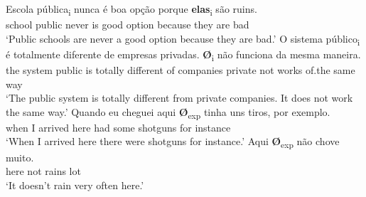 \documentclass[output=paper,colorlinks,citecolor=brown]{langscibook}
\begin{document}
   \z
\z
\ea\label{ex:03:kato:2}
  \ea\label{ex:03:kato:2a}
 \gll Escola pública\textsubscript{i} nunca é boa    opção porque   \textbf{elas}\textsubscript{i} são ruins.\\
           school public    never  is good option because they are bad\\
\glt ‘Public schools are never a good option because they are bad.’
   \ex\label{ex:03:kato:2b}
 \gll O sistema  público\textsubscript{i} é totalmente diferente de empresas privadas. \textbf{Ø}\textsubscript{i} não funciona da    mesma maneira.\\
          the system public   is totally        different of companies private   {}  not  works   of.the same way\\
        \glt ‘The public system is totally different from private companies. It does not work the same way.’
  \z
\z
\ea\label{ex:03:kato:3}
  \ea\label{ex:03:kato:3a}
 \gll Quando eu cheguei aqui \textbf{Ø}\textsubscript{exp} tinha  uns   tiros,        por exemplo.\\
          when    I    arrived  here    {}    had    some shotguns for instance\\
          \glt ‘When I arrived here there were shotguns for instance.’
   \ex\label{ex:03:kato:3b}
 \gll Aqui \textbf{Ø}\textsubscript{exp} não chove muito.\\
         here    {}      not  rains    lot\\
        \glt ‘It doesn’t rain very often here.’
   \z
\z
\ea\label{ex:03:kato:4}
  \label{ex:03:kato:4a}
   \label{ex:03:kato:4b}
  \label{ex:03:kato:4c}
  \z
\z




\end{document}
